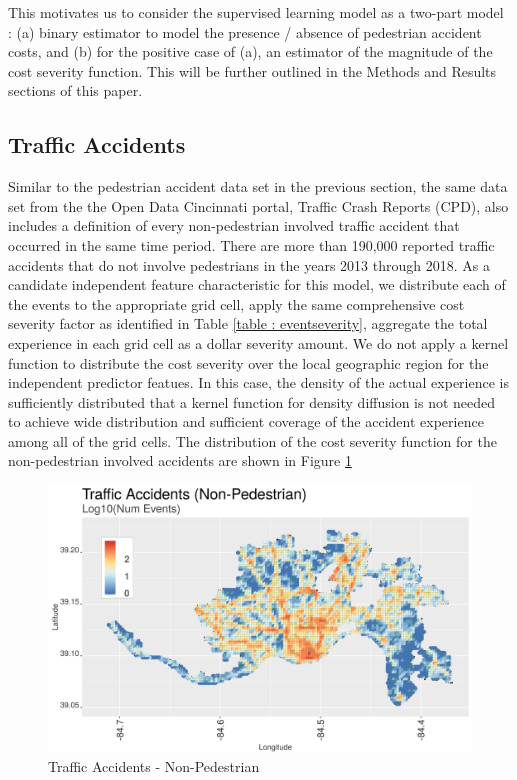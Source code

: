 \documentclass{llncs}
\begin{document}
This motivates us to consider the supervised learning model as a two-part model : (a) binary estimator to model the presence / absence of pedestrian accident costs, and (b) for the positive case of (a), an estimator of the magnitude of the cost severity function. This will be further outlined in the Methods and Results sections of this paper.


\subsection{Traffic Accidents}

Similar to the pedestrian accident data set in the previous section, the same data set from the the Open Data Cincinnati portal, Traffic Crash Reports (CPD), also includes a definition of every non-pedestrian involved traffic accident that occurred in the same time period.  There are more than 190,000 reported traffic accidents that do not involve pedestrians in the years 2013 through 2018. As a candidate independent feature characteristic for this model, we distribute each of the events to the appropriate grid cell, apply the same comprehensive cost severity factor as identified in Table \ref{table : eventseverity}, aggregate the total experience in each grid cell as a dollar severity amount. We do not apply a kernel function to distribute the cost severity over the local geographic region for the independent predictor featues. In this case, the density of the actual experience is sufficiently distributed that a kernel function for density diffusion is not needed to achieve wide distribution and sufficient coverage of the accident experience among all of the grid cells. The distribution of the cost severity function for the non-pedestrian involved accidents are shown in Figure \ref{figure : trafficAccidentsNonPedestrian}

\FloatBarrier
\begin{figure}
 	\includegraphics[width=\textwidth, height=\textheight, keepaspectratio]{trafficAccidentsNonPedestrian}
 	\caption{Traffic Accidents - Non-Pedestrian}
	\label{figure : trafficAccidentsNonPedestrian}
\end{figure}
\FloatBarrier
\end{document}
